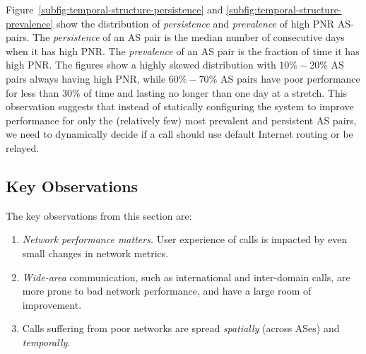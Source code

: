 Figure~\ref{subfig:temporal-structure-persistence} and 
\ref{subfig:temporal-structure-prevalence} show the 
distribution of {\em persistence} and {\em prevalence} of 
high PNR AS-pairs. 
The {\em persistence} of an AS pair is the median 
number of consecutive days when it has high PNR. 
The {\em prevalence} of an AS pair is the fraction of 
time it has high PNR.
The figures show a highly skewed distribution with 
$10\%-20\%$ AS pairs always having high PNR, while 
$60\%-70\%$ AS pairs have poor performance for less 
than $30\%$ of time and lasting no longer than one 
day at a stretch. 
This observation suggests that instead of statically 
configuring the system to improve performance for 
only the (relatively few) most prevalent and persistent 
AS pairs, we need to dynamically decide if a call 
should use default Internet routing or be relayed. %





\subsection{Key Observations}
\label{subsec:measurement:voip:findings}

The key observations from this section are:
\begin{enumerate}
\item {\em Network performance matters.} User experience of 
calls is impacted by even small changes in network metrics. 
\item {\em Wide-area} communication, such as international 
and inter-domain calls, are more prone to bad network performance, 
and have a large room of improvement.
\item Calls suffering from poor networks are spread {\em spatially} 
(across ASes) and {\em temporally}. %
\end{enumerate}

